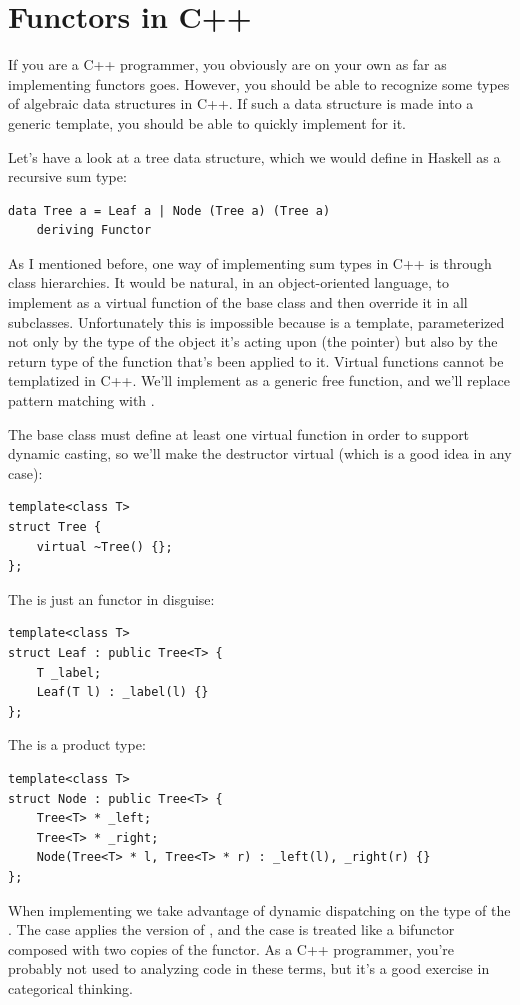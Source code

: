 \section{Functors in C++}\label{functors-in-c}

If you are a C++ programmer, you obviously are on your own as far as
implementing functors goes. However, you should be able to recognize
some types of algebraic data structures in C++. If such a data structure
is made into a generic template, you should be able to quickly implement
 for it.

Let's have a look at a tree data structure, which we would define in
Haskell as a recursive sum type:

\begin{verbatim}
data Tree a = Leaf a | Node (Tree a) (Tree a)
    deriving Functor
\end{verbatim}
As I mentioned before, one way of implementing sum types in C++ is
through class hierarchies. It would be natural, in an object-oriented
language, to implement  as a virtual function of the base
class  and then override it in all subclasses.
Unfortunately this is impossible because  is a template,
parameterized not only by the type of the object it's acting upon (the
 pointer) but also by the return type of the function
that's been applied to it. Virtual functions cannot be templatized in
C++. We'll implement  as a generic free function, and we'll
replace pattern matching with .

The base class must define at least one virtual function in order to
support dynamic casting, so we'll make the destructor virtual (which is
a good idea in any case):

\begin{verbatim}
template<class T>
struct Tree { 
    virtual ~Tree() {};
};
\end{verbatim}
The  is just an  functor in disguise:

\begin{verbatim}
template<class T>
struct Leaf : public Tree<T> {
    T _label;
    Leaf(T l) : _label(l) {}
};
\end{verbatim}
The  is a product type:

\begin{verbatim}
template<class T>
struct Node : public Tree<T> {
    Tree<T> * _left;
    Tree<T> * _right;
    Node(Tree<T> * l, Tree<T> * r) : _left(l), _right(r) {}
};
\end{verbatim}
When implementing  we take advantage of dynamic dispatching
on the type of the . The  case applies the
 version of , and the  case
is treated like a bifunctor composed with two copies of the
 functor. As a C++ programmer, you're probably not used to
analyzing code in these terms, but it's a good exercise in categorical
thinking.

